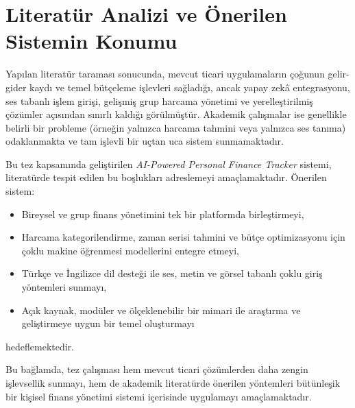 \section{Literatür Analizi ve Önerilen Sistemin Konumu}

Yapılan literatür taraması sonucunda, mevcut ticari uygulamaların çoğunun gelir-gider kaydı ve temel bütçeleme işlevleri sağladığı, ancak yapay zekâ entegrasyonu, ses tabanlı işlem girişi, gelişmiş grup harcama yönetimi ve yerelleştirilmiş çözümler açısından sınırlı kaldığı görülmüştür. Akademik çalışmalar ise genellikle belirli bir probleme (örneğin yalnızca harcama tahmini veya yalnızca ses tanıma) odaklanmakta ve tam işlevli bir uçtan uca sistem sunmamaktadır.

Bu tez kapsamında geliştirilen \textit{AI-Powered Personal Finance Tracker} sistemi, literatürde tespit edilen bu boşlukları adreslemeyi amaçlamaktadır. Önerilen sistem:

\begin{itemize}
    \item Bireysel ve grup finans yönetimini tek bir platformda birleştirmeyi,
    \item Harcama kategorilendirme, zaman serisi tahmini ve bütçe optimizasyonu için çoklu makine öğrenmesi modellerini entegre etmeyi,
    \item Türkçe ve İngilizce dil desteği ile ses, metin ve görsel tabanlı çoklu giriş yöntemleri sunmayı,
    \item Açık kaynak, modüler ve ölçeklenebilir bir mimari ile araştırma ve geliştirmeye uygun bir temel oluşturmayı
\end{itemize}

hedeflemektedir.

Bu bağlamda, tez çalışması hem mevcut ticari çözümlerden daha zengin işlevsellik sunmayı, hem de akademik literatürde önerilen yöntemleri bütünleşik bir kişisel finans yönetimi sistemi içerisinde uygulamayı amaçlamaktadır.
